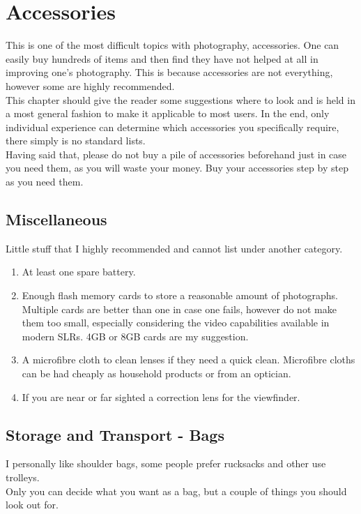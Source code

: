 \chapter{Accessories}

This is one of the most difficult topics with photography, accessories. One can easily buy hundreds of items and then find they have not helped at all in improving one's photography. This is because accessories are not everything, however some are highly recommended.
\\
This chapter should give the reader some suggestions where to look and is held in a most general fashion to make it applicable to most users. In the end, only individual experience can determine which accessories you specifically require, there simply is no standard lists.
\\[\baselineskip]
Having said that, please do not buy a pile of accessories beforehand just in case you need them, as you will waste your money. Buy your accessories step by step as you need them.

\section{Miscellaneous}

Little stuff that I highly recommended and cannot list under another category.
\begin{enumerate}[i]
	\item At least one spare battery.
	\item Enough flash memory cards to store a reasonable amount of photographs. Multiple cards are better than one in case one fails, however do not make them too small, especially considering the video capabilities available in modern SLRs. 4GB or 8GB cards are my suggestion.
	\item A microfibre cloth to clean lenses if they need a quick clean. Microfibre cloths can be had cheaply as household products or from an optician.
	\item If you are near or far sighted a correction lens for the \gls{viewfinder}.
\end{enumerate}

\section{Storage and Transport - Bags}

I personally like shoulder bags, some people prefer rucksacks and other use trolleys.
\\
Only you can decide what you want as a bag, but a couple of things you should look out for.

